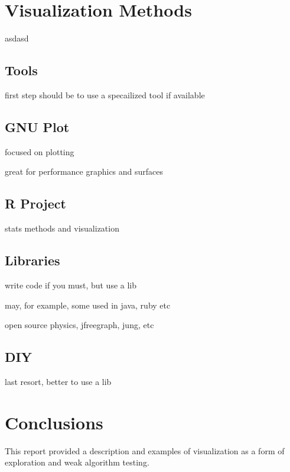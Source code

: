 \documentclass[a4paper, 11pt]{article}
\begin{document}
%
%
\section{Visualization Methods}
asdasd

\subsection{Tools}
first step should be to use a specailized tool if available

\subsection{GNU Plot}
focused on plotting

great for performance graphics and surfaces

\subsection{R Project}
stats methods and visualization


\subsection{Libraries}
write code if you must, but use a lib

may, for example, some used in java, ruby etc

open source physics, jfreegraph, jung, etc


\subsection{DIY}
last resort, better to use a lib


%
%
\section{Conclusions}
\label{sec:conclusions}
This report provided a description and examples of visualization as a form of exploration and weak algorithm testing. 



\end{document}
